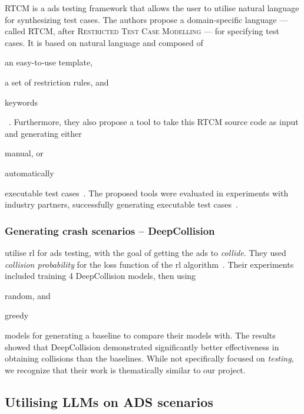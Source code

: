 RTCM is a \acrshort{ads} testing framework that allows the user to utilise natural language for
synthesizing test cases. The authors propose a domain-specific language --- called RTCM, after
\textsc{Restricted Test Case Modelling} --- for specifying test cases. It is based on natural language
and composed of \begin{inparaenum}
    \item an easy-to-use template,
    \item a set of restriction rules, and
    \item keywords \end{inparaenum}~\cite[397]{RTCM}.  Furthermore, they also propose a tool to
take this RTCM source code as input and generating either \begin{inparaenum}
    \item manual, or
    \item automatically \end{inparaenum} executable test cases~\cite[397]{RTCM}. The proposed tools
were evaluated in experiments with industry partners, successfully generating executable test
cases~\cite[397]{RTCM}.

\subsubsection{Generating crash scenarios -- DeepCollision}

\citeauthor{deepCollision} utilise \acrfull{rl} for \acrshort{ads} testing, with the goal of getting
the \acrshort{ads} to \textit{collide}. They used \textit{collision probability} for the loss
function of the \acrlong{rl} algorithm~\cite[384]{deepCollision}. Their experiments included
training 4 DeepCollision models, then using \begin{inparaenum}
    \item random, and
    \item greedy
\end{inparaenum} models for generating a baseline to compare their models with. The results showed
that DeepCollision demonstrated significantly better effectiveness in obtaining collisions than the
baselines. While not specifically focused on \textit{testing}, we recognize that their work is
thematically similar to our project.

\newpage %

\subsection{Utilising LLMs on ADS scenarios}

